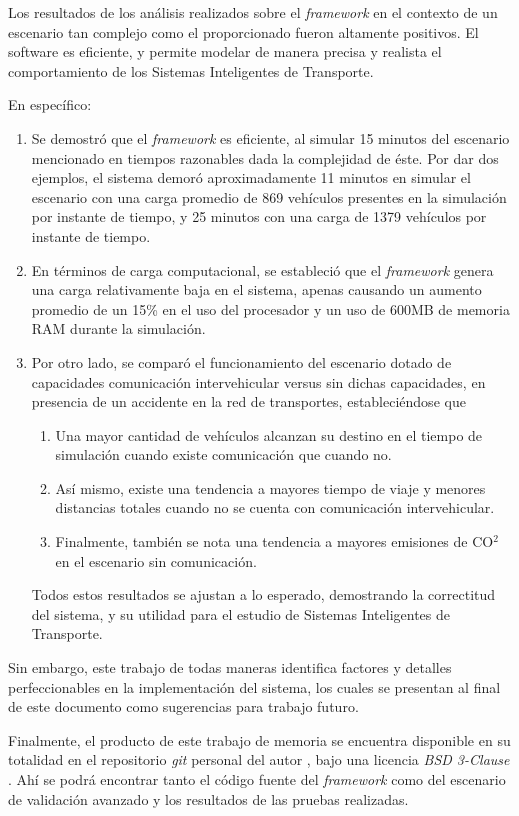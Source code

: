 Los resultados de los análisis realizados sobre el \emph{framework} en el contexto de un escenario tan complejo como el proporcionado fueron altamente positivos. El software es eficiente, y permite modelar de manera precisa y realista el comportamiento de los Sistemas Inteligentes de Transporte.

En específico:

\begin{enumerate}
    \item Se demostró que el \emph{framework} es eficiente, al simular 15 minutos del escenario mencionado en tiempos razonables dada la complejidad de éste. Por dar dos ejemplos, el sistema demoró aproximadamente 11 minutos en simular el escenario con una carga promedio de 869 vehículos presentes en la simulación por instante de tiempo, y 25 minutos con una carga de 1379 vehículos por instante de tiempo.
    
    \item En términos de carga computacional, se estableció que el \emph{framework} genera una carga relativamente baja en el sistema, apenas causando un aumento promedio de un 15\% en el uso del procesador y un uso de 600MB de memoria RAM durante la simulación. 
    
    \item Por otro lado, se comparó el funcionamiento del escenario dotado de capacidades comunicación intervehicular versus sin dichas capacidades, en presencia de un accidente en la red de transportes, estableciéndose que
    \begin{enumerate}
        \item Una mayor cantidad de vehículos alcanzan su destino en el tiempo de simulación cuando existe comunicación que cuando no.
        \item Así mismo, existe una tendencia a mayores tiempo de viaje y menores distancias totales cuando no se cuenta con comunicación intervehicular.
        \item Finalmente, también se nota una tendencia a mayores emisiones de CO$^{2}$ en el escenario sin comunicación.
    \end{enumerate}

    Todos estos resultados se ajustan a lo esperado, demostrando la correctitud del sistema, y su utilidad para el estudio de Sistemas Inteligentes de Transporte.
\end{enumerate}

Sin embargo, este trabajo de todas maneras identifica factores y detalles perfeccionables en la implementación del sistema, los cuales se presentan al final de este documento como sugerencias para trabajo futuro. 

Finalmente, el producto de este trabajo de memoria se encuentra disponible en su totalidad en el repositorio \emph{git} personal del autor \autocite{pveins_github}, bajo una licencia \emph{BSD 3-Clause} \autocite{bsd3clause}. Ahí se podrá encontrar tanto el código fuente del \emph{framework} como del escenario de validación avanzado y los resultados de las pruebas realizadas.
\newpage